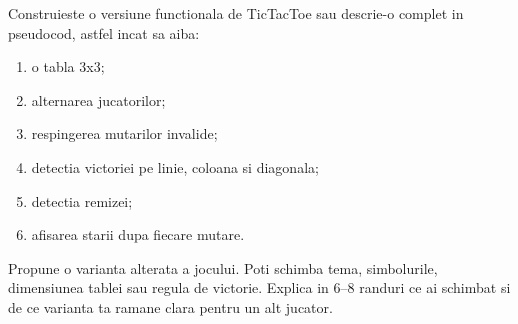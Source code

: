 \begin{bossbox}
Construieste o versiune functionala de TicTacToe sau descrie-o complet in pseudocod, astfel incat sa aiba:
\begin{enumerate}
\item o tabla 3x3;
\item alternarea jucatorilor;
\item respingerea mutarilor invalide;
\item detectia victoriei pe linie, coloana si diagonala;
\item detectia remizei;
\item afisarea starii dupa fiecare mutare.
\end{enumerate}
\end{bossbox}

\begin{solobox}
Propune o varianta alterata a jocului. Poti schimba tema, simbolurile, dimensiunea tablei sau regula de victorie. Explica in 6--8 randuri ce ai schimbat si de ce varianta ta ramane clara pentru un alt jucator.
\end{solobox}

\clearpage
